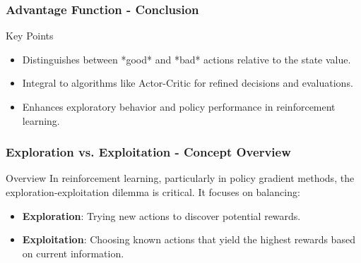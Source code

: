 \documentclass[aspectratio=169]{beamer}
\begin{document}
\begin{frame}[fragile]
    \frametitle{Advantage Function - Conclusion}
    \begin{block}{Key Points}
        \begin{itemize}
            \item Distinguishes between *good* and *bad* actions relative to the state value.
            \item Integral to algorithms like Actor-Critic for refined decisions and evaluations.
            \item Enhances exploratory behavior and policy performance in reinforcement learning.
        \end{itemize}
    \end{block}
\end{frame}

\begin{frame}[fragile]
    \frametitle{Exploration vs. Exploitation - Concept Overview}
    \begin{block}{Overview}
        In reinforcement learning, particularly in policy gradient methods, the exploration-exploitation dilemma is critical. It focuses on balancing:
    \end{block}
    \begin{itemize}
        \item \textbf{Exploration}: Trying new actions to discover potential rewards.
        \item \textbf{Exploitation}: Choosing known actions that yield the highest rewards based on current information.
    \end{itemize}
\end{frame}
\end{document}
